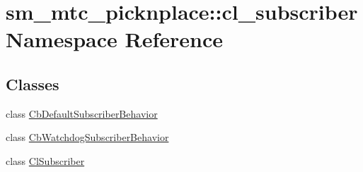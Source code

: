 \hypertarget{namespacesm__mtc__picknplace_1_1cl__subscriber}{}\section{sm\+\_\+mtc\+\_\+picknplace\+:\+:cl\+\_\+subscriber Namespace Reference}
\label{namespacesm__mtc__picknplace_1_1cl__subscriber}
\subsection*{Classes}
\begin{DoxyCompactItemize}
\item 
class \hyperlink{classsm__mtc__picknplace_1_1cl__subscriber_1_1CbDefaultSubscriberBehavior}{Cb\+Default\+Subscriber\+Behavior}
\item 
class \hyperlink{classsm__mtc__picknplace_1_1cl__subscriber_1_1CbWatchdogSubscriberBehavior}{Cb\+Watchdog\+Subscriber\+Behavior}
\item 
class \hyperlink{classsm__mtc__picknplace_1_1cl__subscriber_1_1ClSubscriber}{Cl\+Subscriber}
\end{DoxyCompactItemize}
